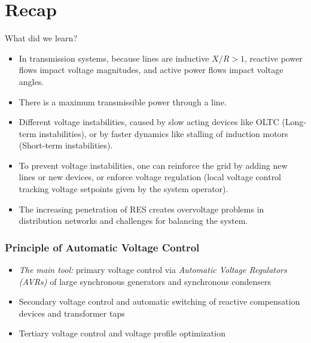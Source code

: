 \section{Recap}
\begin{frame}{What did we learn?}
\begin{itemize}
    \item In transmission systems, because lines are inductive $X/R > 1$, reactive power flows impact voltage magnitudes, and active power flows impact voltage angles.
    \item There is a maximum transmissible power through a line.
    \item Different voltage instabilities, caused by slow acting devices like OLTC (Long-term instabilities), or by faster dynamics like stalling of induction motors (Short-term instabilities).
    \item To prevent voltage instabilities, one can reinforce the grid by adding new lines or new devices, or enforce voltage regulation (local voltage control tracking voltage setpoints given by the system operator).
    \item The increasing penetration of RES creates overvoltage problems in distribution networks and challenges for balancing the system.
\end{itemize}
\end{frame}

\begin{frame}
    \frametitle{Principle of Automatic Voltage Control}
    \begin{itemize}
        \item \textit{The main tool:} primary voltage control via \textit{Automatic Voltage Regulators (AVRs)} of large synchronous generators and synchronous condensers
        \item Secondary voltage control and automatic switching of reactive compensation devices and transformer taps
        \item Tertiary voltage control and voltage profile optimization
    \end{itemize}
\end{frame}

